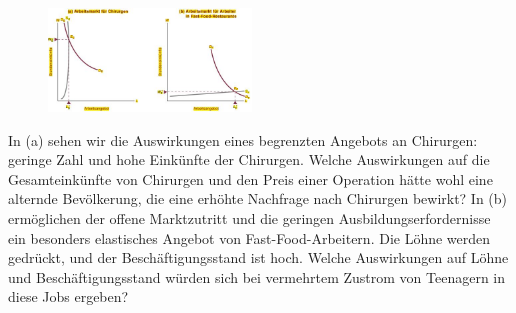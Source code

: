 \documentclass[10pt]{scrartcl}
\begin{document}
\begin{figure}
  \begin{center}
  	\vspace{-10pt}
    \includegraphics[width=0.48\textwidth]{img/faktor-arbeit.jpg}
    \vspace{-10pt}
    \end{center}
\end{figure}
In (a) sehen wir die Auswirkungen eines begrenzten Angebots an Chirurgen: geringe Zahl und hohe Einkünfte der
Chirurgen. Welche Auswirkungen auf die Gesamteinkünfte von Chirurgen und den Preis einer Operation hätte wohl eine
alternde Bevölkerung, die eine erhöhte Nachfrage nach Chirurgen bewirkt?
In (b) ermöglichen der offene Marktzutritt und die geringen Ausbildungserfordernisse ein besonders elastisches Angebot
von Fast-Food-Arbeitern. Die Löhne werden gedrückt, und der Beschäftigungsstand ist hoch. Welche Auswirkungen auf
Löhne und Beschäftigungsstand würden sich bei vermehrtem Zustrom von Teenagern in diese Jobs ergeben?
\end{document}
